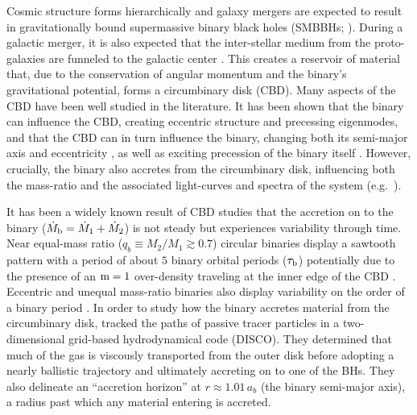 \documentclass[fleqn,usenatbib]{mnras}
\begin{document}
Cosmic structure forms hierarchically and galaxy mergers are expected to result in gravitationally bound supermassive binary black holes (SMBBHs; \citealt{white_rees_78, begelman_blandford_rees_80}). During a galactic merger, it is also expected that the inter-stellar medium from the proto-galaxies are funneled to the galactic center \citep{barnes_hernquist_92}. This creates a reservoir of material that, due to the conservation of angular momentum and the binary's gravitational potential, forms a circumbinary disk (CBD). Many aspects of the CBD have been well studied in the literature. It has been shown that the binary can influence the CBD, creating eccentric structure and precessing eigenmodes, \citep{lubow_91, whitehurst_94, nelson_2003, Goodchild_2006, MacFadyen_08, paardekooper_2008, kley_2008, shi_2012, miranda_munoz_lai_2017, Thun_2017, munoz_lithwick_2020, Lubow_2022, siwek_prefacc} and that the CBD can in turn influence the binary, changing both its semi-major axis and eccentricity \citep{farris_2014, Moody_19, munoz_miranda_lai_19, Tiede_2020, zrake_2021, dorazio_2013, siwek_cbdorbevol, dorazio_duffel}, as well as exciting precession of the binary itself \citep{tiede_24_diskinducedprecession, dittmann_prec, calcino_prec}. However, crucially, the binary also accretes from the circumbinary disk, influencing both the mass-ratio and the associated light-curves and spectra of the system (e.g.\ \citealt{dorazio_2013, dorazio_charisi, siwek_prefacc, ryan_2022, farris_2014, tiede_dorazio_2025_hotcoldmulticomponentaccretion}).



It has been a widely known result of CBD studies that the accretion on to the binary ($\dot{M}_{\rm{b}} = \dot{M}_1 + \dot{M}_2$) is not steady but experiences variability through time. Near equal-mass ratio ($q_b \equiv M_2/M_1 \gtrsim 0.7$) circular binaries display a sawtooth pattern with a period of about $5$ binary orbital periods ($\tau_{\rm{b}}$) potentially due to the presence of an $\rm{m}=1$ over-density traveling at the inner edge of the CBD \citep{MacFadyen_08, miranda_munoz_lai_2017, munoz_miranda_lai_19, ryan_2022}. Eccentric and unequal mass-ratio binaries also display variability on the order of a binary period \citep{dorazio_2013, farris_2014, miranda_munoz_lai_2017, munoz_miranda_lai_19, duffell_dorazio_2020, ryan_2022}. In order to study how the binary accretes material from the circumbinary disk, \citet{Tiede_22} tracked the paths of passive tracer particles in a two-dimensional grid-based hydrodynamical code (DISCO). They determined that much of the gas is viscously transported from the outer disk before adopting a nearly ballistic trajectory and ultimately accreting on to one of the BHs. They also delineate an ``accretion horizon'' at $r \approx 1.01 \, a_b$ (the binary semi-major axis), a radius past which any material entering is accreted.
\end{document}
